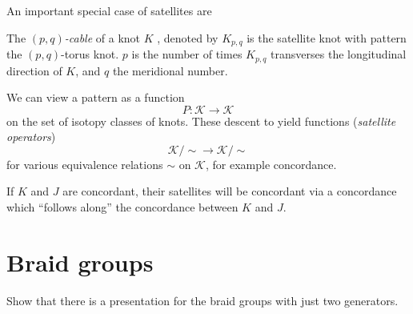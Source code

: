 An important special case of satellites are
\begin{definition}[$(p,q)$-cables]
	The \textit{$(p,q)$-cable} of a knot $K$
	,
	denoted by $K_{p, q}$
	is the satellite knot with pattern the $(p, q)$-torus knot.
	$p$ is the number of times $K_{p, q}$ transverses
	the longitudinal direction of $K$,
	and $q$ the meridional number.
\end{definition}

We can view a pattern as a function
\begin{equation*}
	P \colon \mathcal{K} \rightarrow \mathcal{K}
\end{equation*}
on the set of isotopy classes of
knots.
These descent to yield functions (\textit{satellite operators})
\begin{equation*}
	\mathcal{K} / \sim \rightarrow \mathcal{K}/ \sim
\end{equation*}
for various equivalence relations $\sim$ on $\mathcal{K}$, for example
concordance.

If $K$ and $J$ are concordant, their satellites will be concordant
via a concordance which ``follows along'' the concordance between
$K$ and $J$.



\section{Braid groups}

\begin{exercise}
	Show that there is a presentation for the braid groups
	with just two generators.
\end{exercise}

